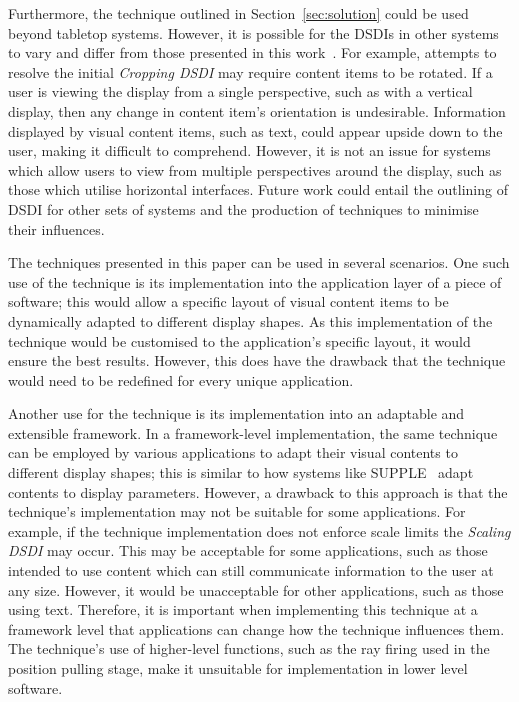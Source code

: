 \documentclass[review,5p,times,twocolumn]{elsarticle}
\begin{document}
Furthermore, the technique outlined in Section~\ref{sec:solution} could be used beyond tabletop systems.
However, it is possible for the \acp{DSDI} in other systems to vary and differ from those presented in this work~\cite{Serrano2017}. 
For example, attempts to resolve the initial {\emph{Cropping \ac{DSDI}}} may require content items to be rotated.
If a user is viewing the display from a single perspective, such as with a vertical display, then any change in content item's orientation is undesirable.
Information displayed by visual content items, such as text, could appear upside down to the user, making it difficult to comprehend.
However, it is not an issue for systems which allow users to view from multiple perspectives around the display, such as those which utilise horizontal interfaces.
Future work could entail the outlining of \ac{DSDI} for other sets of systems and the production of techniques to minimise their influences.

The techniques presented in this paper can be used in several scenarios.
One such use of the technique is its implementation into the application layer of a piece of software; this would allow a specific layout of visual content items to be dynamically adapted to different display shapes.
As this implementation of the technique would be customised to the application's specific layout, it would ensure the best results.
However, this does have the drawback that the technique would need to be redefined for every unique application.

Another use for the technique is its implementation into an adaptable and extensible framework.
In a framework-level implementation, the same technique can be
employed by various applications to adapt their visual contents to different display shapes; this is similar to how systems like SUPPLE~\cite{Gajos2004} adapt contents to display parameters.
However, a drawback to this approach is that the technique's implementation may not be suitable for some applications.  
For example, if the technique implementation does not enforce scale limits the {\emph{Scaling \ac{DSDI}}} may occur.
This may be acceptable for some applications, such as those intended to use content which can still communicate information to the user at any size.
However, it would be unacceptable for other applications, such as those using text.
Therefore, it is important when implementing this technique at a framework level that applications can change how the technique influences them.
The technique's use of higher-level functions, such as the ray firing used in the position pulling stage, make it unsuitable for implementation in lower level software.
\end{document}
